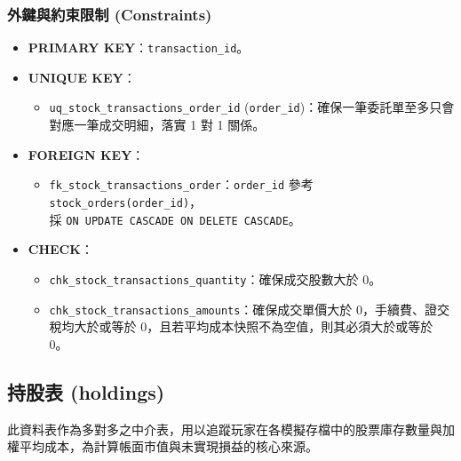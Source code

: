 \documentclass[UTF8, a4paper, 12pt, fontset=none]{ctexart}
\begin{document}
    \subsubsection*{外鍵與約束限制 (Constraints)}
    \begin{itemize}
        \item \textbf{PRIMARY KEY}：\texttt{transaction\_id}。
        \item \textbf{UNIQUE KEY}：
            \begin{itemize}
                \item \texttt{uq\_stock\_transactions\_order\_id} (\texttt{order\_id})：確保一筆委託單至多只會對應一筆成交明細，落實 1 對 1 關係。
            \end{itemize}
        \item \textbf{FOREIGN KEY}：
            \begin{itemize}
                \item \texttt{fk\_stock\_transactions\_order}：\texttt{order\_id} 參考 \texttt{stock\_orders(order\_id)}，\\採 \texttt{ON UPDATE CASCADE ON DELETE CASCADE}。
            \end{itemize}
        \item \textbf{CHECK}：
            \begin{itemize}
                \item \texttt{chk\_stock\_transactions\_quantity}：確保成交股數大於 0。
                \item \texttt{chk\_stock\_transactions\_amounts}：確保成交單價大於 0，手續費、證交稅均大於或等於 0，且若平均成本快照不為空值，則其必須大於或等於 0。
            \end{itemize}
    \end{itemize}

    \subsection{持股表 (holdings)}
    

    此資料表作為多對多之中介表，用以追蹤玩家在各模擬存檔中的股票庫存數量與加權平均成本，為計算帳面市值與未實現損益的核心來源。
\end{document}
